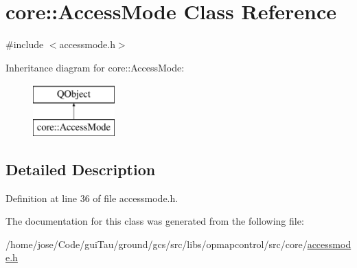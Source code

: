 \hypertarget{classcore_1_1_access_mode}{\section{core\-:\-:Access\-Mode Class Reference}
\label{classcore_1_1_access_mode}
}


{\ttfamily \#include $<$accessmode.\-h$>$}

Inheritance diagram for core\-:\-:Access\-Mode\-:\begin{figure}[H]
\begin{center}
\leavevmode
\includegraphics[height=2.000000cm]{classcore_1_1_access_mode}
\end{center}
\end{figure}


\subsection{Detailed Description}


Definition at line 36 of file accessmode.\-h.



The documentation for this class was generated from the following file\-:\begin{DoxyCompactItemize}
\item 
/home/jose/\-Code/gui\-Tau/ground/gcs/src/libs/opmapcontrol/src/core/\hyperlink{accessmode_8h}{accessmode.\-h}\end{DoxyCompactItemize}
